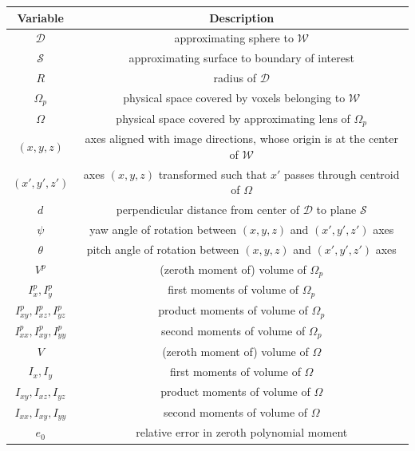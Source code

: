 \begin{table}[t!]
 \centering
   \begin{tabular}{|c||c|}
   \hline
   {\textbf{Variable}} & {\textbf{Description}} \\ \hline \hline
   $\mathcal{D}$ & approximating sphere to $\mathcal{W}$ \\ \hline
   $\mathcal{S}$ & approximating surface to boundary of interest \\ \hline      
   $R$ & radius of $\mathcal{D}$ \\ \hline   
   $\Omega_p$ & physical space covered by voxels belonging to $\mathcal{W}$ \\ \hline
   $\Omega$ & physical space covered by approximating lens of $\Omega_p$ \\ \hline      
   $(x,y,z)$ & axes aligned with image directions, whose origin is at the center of $\mathcal{W}$\\ \hline
   {$(x',y',z')$} & axes $(x,y,z)$ transformed such that $x'$ passes through centroid of $\Omega$ \\ \hline
   $d$ & perpendicular distance from center of $\mathcal{D}$ to plane $\mathcal{S}$  \\ \hline
   $\psi$ & yaw angle of rotation between $(x,y,z)$ and $(x',y',z')$ axes \\ \hline   
   $\theta$ & pitch angle of rotation between $(x,y,z)$ and $(x',y',z')$ axes \\ \hline
   $V^p$ & (zeroth moment of) volume of $\Omega_p$ \\ \hline
   $I_{x}^p, I_y^p$ & first moments of volume of $\Omega_p$ \\ \hline     
   $I_{xy}^p, I_{xz}^p, I_{yz}^p$ & product moments of volume of $\Omega_p$ \\ \hline      
   $I_{xx}^p, I_{xy}^p, I_{yy}^p$ & second moments of volume of $\Omega_p$ \\ \hline
   $V$ & (zeroth moment of) volume of $\Omega$ \\ \hline
   $I_{x}, I_y$ & first moments of volume of $\Omega$ \\ \hline
   $I_{xy}, I_{xz}, I_{yz}$ & product moments of volume of $\Omega$ \\ \hline   
   $I_{xx}, I_{xy}, I_{yy}$ & second moments of volume of $\Omega$ \\ \hline
   $e_0$ & relative error in zeroth polynomial moment \\ \hline

\end{tabular}
\end{table}
